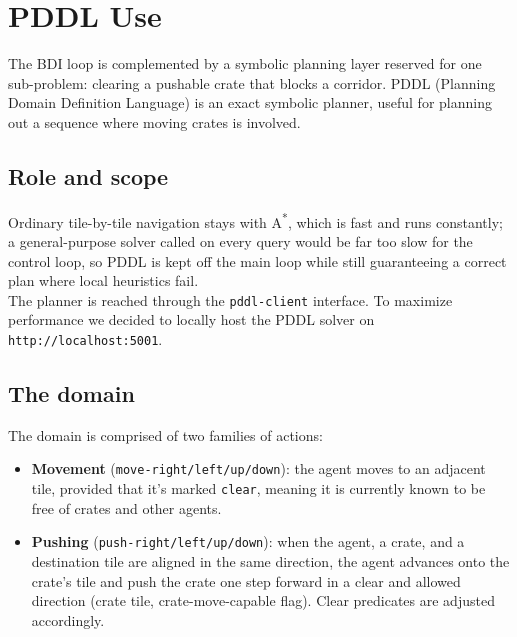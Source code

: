 \chapter{PDDL Use}
\label{ch:pddl}

The BDI loop is complemented by a symbolic planning layer reserved for one
sub-problem: clearing a pushable crate that blocks a corridor. PDDL (Planning Domain Definition Language) 
is an exact symbolic planner, useful for planning out a sequence where moving crates is involved.

\section{Role and scope}
\label{sec:role_scope}
Ordinary tile-by-tile navigation stays with A\textsuperscript{*}, 
which is fast and runs constantly; a
general-purpose solver called on every query would be far too slow for the 
control loop, so PDDL is kept off the main loop while still
guaranteeing a correct plan where local heuristics fail. \\

The planner is reached through the \texttt{pddl-client} interface. To maximize performance 
we decided to locally host the PDDL solver on \texttt{http://localhost:5001}.

\section{The domain}
\label{sec:domain}
The domain is comprised of two families of actions:

\begin{itemize}
  \item \textbf{Movement} (\texttt{move-right/left/up/down}): the agent moves to
        an adjacent tile, provided that it's marked \texttt{clear}, 
        meaning it is currently known to be free of crates and other agents.
  \item \textbf{Pushing} (\texttt{push-right/left/up/down}): when the agent, a
        crate, and a destination tile are aligned in the same direction, the agent
        advances onto the crate's tile and push the crate one step forward in a clear 
        and allowed direction (crate tile, crate-move-capable flag). Clear predicates are
        adjusted accordingly.
\end{itemize}

